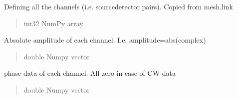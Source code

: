 \documentclass[letterpaper,10pt,english]{sphinxmanual}
\begin{document}
\begin{fulllineitems}

\begin{fulllineitems}
\label{\detokenize{_autosummary/nirfasterff.base.data.FDdata:nirfasterff.base.data.FDdata.link}}
\pysigstartsignatures
\pysigline
{}
\pysigstopsignatures
\sphinxAtStartPar
Defining all the channels (i.e. source\sphinxhyphen{}detector pairs). Copied from mesh.link
\begin{quote}\begin{description}
\sphinxAtStartPar
int32 NumPy array

\end{description}\end{quote}

\end{fulllineitems}


\begin{fulllineitems}
\label{\detokenize{_autosummary/nirfasterff.base.data.FDdata:nirfasterff.base.data.FDdata.amplitude}}
\pysigstartsignatures
\pysigline
{}
\pysigstopsignatures
\sphinxAtStartPar
Absolute amplitude of each channel. I.e. amplitude=abs(complex)
\begin{quote}\begin{description}
\sphinxAtStartPar
double Numpy vector

\end{description}\end{quote}

\end{fulllineitems}


\begin{fulllineitems}
\label{\detokenize{_autosummary/nirfasterff.base.data.FDdata:nirfasterff.base.data.FDdata.phase}}
\pysigstartsignatures
\pysigline
{}
\pysigstopsignatures
\sphinxAtStartPar
phase data of each channel. All zero in case of CW data
\begin{quote}\begin{description}
\sphinxAtStartPar
double Numpy vector


\end{description}
\end{quote}
\end{fulllineitems}
\end{fulllineitems}
\end{document}
